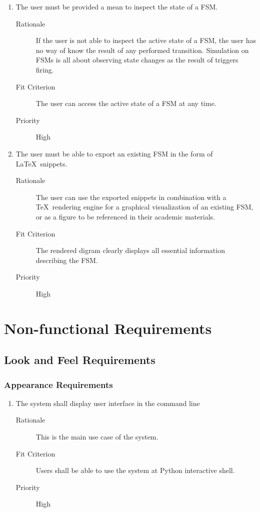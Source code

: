 \documentclass[12pt, titlepage]{article}
\begin{document}
\begin{enumerate}[{FR}1.]
\begin{description}
  \end{description}
\item The user must be provided a mean to inspect the state of a FSM.
  \begin{description}
  \item[Rationale] If the user is not able to inspect the active state of a FSM,
    the user has no way of know the result of any performed transition.
    Simulation on FSMs is all about observing state changes as the result of
    triggers firing.
  \item[Fit Criterion] The user can access the active state of a FSM at any time.
  \item[Priority] High
  \end{description}
\item The user must be able to export an existing FSM in the form of \LaTeX\ snippets.
  \begin{description}
  \item[Rationale] The user can use the exported snippets in combination with a \TeX\
    rendering engine for a graphical visualization of an existing FSM, or as a
    figure to be referenced in their academic materials.
  \item[Fit Criterion] The rendered digram clearly displays all essential
    information describing the FSM.
  \item[Priority] High
  \end{description}
\end{enumerate}

\section{Non-functional Requirements}

\subsection{Look and Feel Requirements}
\subsubsection{Appearance Requirements}
\begin{enumerate}[{NF}1., series=NFR]
\item The system shall display user interface in the command line
  \begin{description}
  \item[Rationale] This is the main use case of the system.
  \item[Fit Criterion] Users shall be able to use the system at Python interactive
    shell.
  \item[Priority] High
  \end{description}
\end{enumerate}
\end{document}
